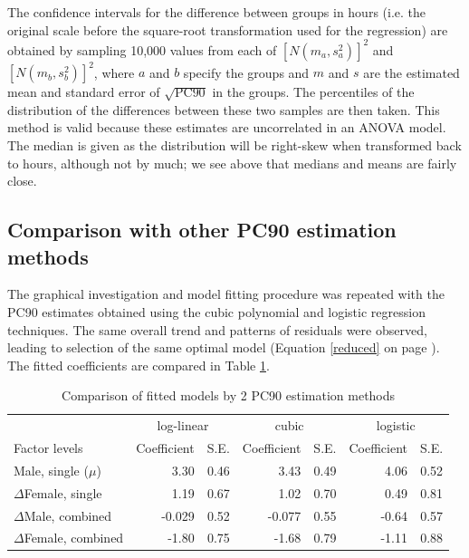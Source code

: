 The confidence intervals for the difference between groups in hours (i.e. the original scale before the square-root transformation used for the regression) are obtained by sampling 10,000 values from each of $[N(m_{a},s_{a}^{2})]^{2}$ and $[N(m_{b},s_{b}^{2})]^{2}$, where $a$ and $b$ specify the groups and $m$ and $s$ are the estimated mean and standard error of $\sqrt{\mathrm{PC}90}$ in the groups. The percentiles of the distribution of the differences between these two samples are then taken. This method is valid because these estimates are uncorrelated in an ANOVA model. The median is given as the distribution will be right-skew when transformed back to hours, although not by much; we see above that medians and means are fairly close.

\subsection{Comparison with other PC90 estimation methods}
The graphical investigation and model fitting procedure was repeated with the PC90 estimates obtained using the cubic polynomial and logistic regression techniques. The same overall trend and patterns of residuals were observed, leading to selection of the same optimal model (Equation \ref{reduced} on page \pageref{reduced}). The fitted coefficients are compared in Table \ref{compmeth}. 
\begin{table}[h]
\centering
\caption{Comparison of fitted models by 2 PC90 estimation methods}\label{compmeth}
\begin{tabular}{l|rr|rr|rr}
&\multicolumn{2}{c|}{log-linear}&\multicolumn{2}{c|}{cubic}&\multicolumn{2}{c}{logistic}\\
Factor levels&Coefficient&S.E.&Coefficient&S.E.&Coefficient&S.E.\\
\hline
Male, single ($\mu$)			& 3.30 & 0.46 & 3.43 &  0.49 & 4.06 & 0.52\\
$\Delta$Female, single		& 1.19 & 0.67 & 1.02 & 0.70  & 0.49 & 0.81\\
$\Delta$Male, combined		& -0.029 & 0.52 & -0.077 & 0.55 & -0.64 & 0.57\\
$\Delta$Female, combined	& -1.80 & 0.75 & -1.68 & 0.79  & -1.11 & 0.88\\
\hline
\end{tabular}
\end{table}

